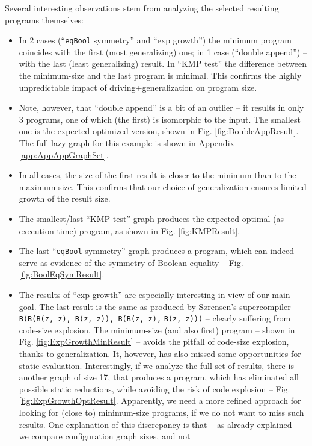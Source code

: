\documentclass[submission,copyright,creativecommons]{eptcs}
\begin{document}
Several interesting observations stem from analyzing the selected resulting programs themselves:
\begin{itemize}
  \item In 2 cases (``\verb|eqBool| symmetry'' and ``exp growth'') the minimum program coincides with the first (most generalizing) one;
    in 1 case (``double append'') -- with the last (least generalizing) result. 
    In ``KMP test'' the difference between the minimum-size and the last program is minimal.
    This confirms the highly unpredictable impact of driving+generalization on program size.
  \item Note, however, that ``double append'' is a bit of an outlier -- it results in only 3 programs,
    one of which (the first) is isomorphic to the input. The smallest one is the expected
    optimized version, shown in Fig. \ref{fig:DoubleAppResult}.
    The full lazy graph for this example is shown in Appendix \ref{app:AppAppGraphSet}.
  \item In all cases, the size of the first result is closer to the minimum than to the maximum size.
    This confirms that our choice of generalization ensures limited growth of the result size.
  \item The smallest/last ``KMP test'' graph produces the expected optimal (as execution time) program,
    as shown in Fig. \ref{fig:KMPResult}.
  \item The last ``\verb|eqBool| symmetry'' graph produces a program, which can indeed serve as evidence of the
    symmetry of Boolean equality -- Fig. \ref{fig:BoolEqSymResult}.
  \item The results of ``exp growth'' are especially interesting in view of our main goal.
    The last result is the same as produced by S{\o}rensen's supercompiler --
    \verb|B(B(B(z, z), B(z, z)), B(B(z, z),| \verb|B(z, z)))| -- clearly suffering from code-size explosion.
    The minimum-size (and also first) program -- shown in Fig. \ref{fig:ExpGrowthMinResult} --
    avoids the pitfall of code-size explosion, thanks to generalization.
    It, however, has also missed some opportunities for static evaluation.
    Interestingly, if we analyze the full set of results, there is another
    graph of size 17, that produces a program, which has eliminated all possible static reductions,
    while avoiding the risk of code explosion -- Fig. \ref{fig:ExpGrowthOptResult}.
    Apparently, we need a more refined approach for looking for (close to) minimum-size programs, 
    if we do not want to miss such results.
    One explanation of this discrepancy is that -- as already explained -- we compare configuration graph sizes, and not

\end{itemize}
\end{document}
